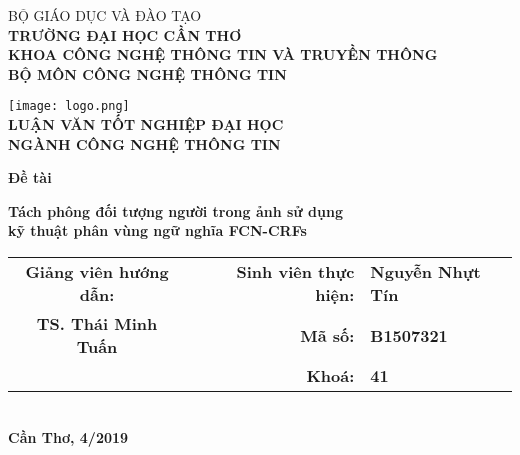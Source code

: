 \documentclass[../the.tex]{subfiles}
\begin{document}
\begin{titlepage}

\begin{center}
\thispagestyle{empty}
\thisfancypage{\setlength{\fboxsep}{15pt}\doublebox}{}
{\fontsize{14}{12}\selectfont BỘ GIÁO DỤC VÀ ĐÀO TẠO\\
\textbf{TRƯỜNG ĐẠI HỌC CẦN THƠ\\}
\textbf{KHOA CÔNG NGHỆ THÔNG TIN VÀ TRUYỀN THÔNG\\}
\textbf{BỘ MÔN CÔNG NGHỆ THÔNG TIN\\[1cm]}}

\texttt{[image: logo.png]}\\[1cm]

{\fontsize{14}{12}\selectfont
\textbf{LUẬN VĂN TỐT NGHIỆP ĐẠI HỌC\\}}
{\fontsize{15}{12}\selectfont
\textbf{NGÀNH CÔNG NGHỆ THÔNG TIN\\[2cm]}}

\begin{large}
\textbf{Đề tài\\[0.5cm]}
\end{large}
{\fontsize{20}{12}\selectfont
\textbf{{Tách phông đối tượng người trong ảnh sử dụng\\ kỹ thuật phân vùng ngữ nghĩa FCN-CRFs}}}
\\[4cm]

{\fontsize{15}{12}\selectfont
\begin{tabular}{ c c r l }
 \textbf{Giảng viên hướng dẫn:} & & \textbf{Sinh viên thực hiện:} & \textbf{Nguyễn Nhựt Tín}\\ 
 \textbf{TS. Thái Minh Tuấn} & & \textbf{Mã số:} & \textbf{B1507321}\\  
 & & \textbf{Khoá:} & \textbf{41}
\end{tabular}}
\\[2cm]

{\fontsize{14}{12}\selectfont
\textbf{Cần Thơ, 4/2019}}

\end{center}

\end{titlepage}
\end{document}
